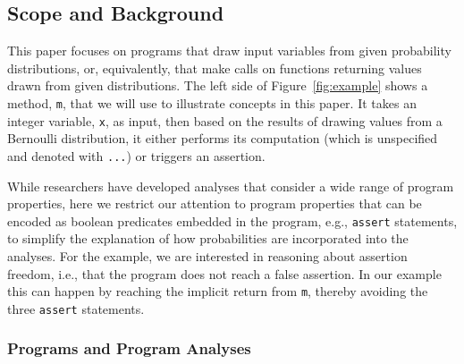 \subsection{Scope and Background}
\label{sec:background}



This paper focuses on programs that draw input variables
from given probability distributions, or, equivalently, that make
calls on functions returning values drawn from given distributions.
The left side of Figure~\ref{fig:example} shows a method,
\texttt{m}, that we will use to illustrate concepts in this paper.     
It takes an integer variable, \texttt{x}, as input, then based on the 
results of drawing values from a Bernoulli distribution,
it either performs its computation
(which is unspecified and denoted with \texttt{...}) or triggers
an assertion. 

While researchers have developed analyses that consider a wide
range of program properties, here
we restrict our attention to program
properties that can be encoded as boolean predicates 
embedded in the program,
e.g., \texttt{assert} statements, to simplify the explanation
of how probabilities are incorporated into the analyses.
For the example, we are interested in reasoning about
assertion freedom, i.e., that the program does
not reach a false assertion.
In our example
this can happen by reaching the implicit return from \texttt{m},
thereby avoiding the three \texttt{assert} statements.




\subsubsection{Programs and Program Analyses}

